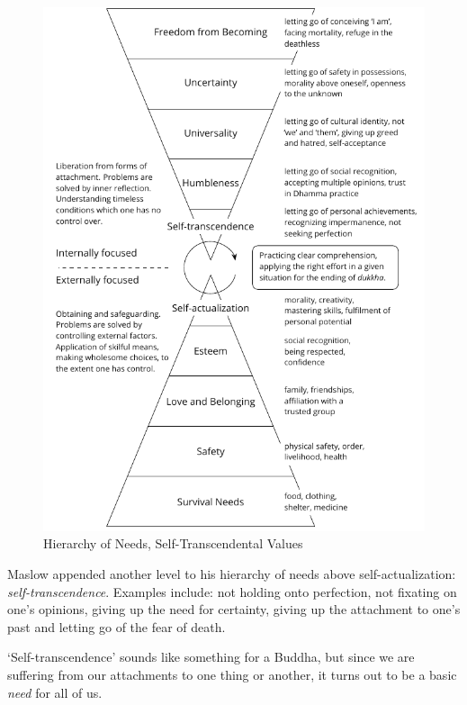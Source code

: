 \begin{figure}[h]
\vspace*{-15pt}
\caption{Hierarchy of Needs, Self-Transcendental Values}\label{fig-self-transcendental}
\bigskip
\includegraphics[width=\linewidth]{./manuscript/tex/diagrams/self-transcendental-values.pdf}
\end{figure}

\clearpage
\normalpagelayout

Maslow appended another level to his hierarchy of needs above
self-actualization: \emph{self-transcendence}. Examples include: not
holding onto perfection, not fixating on one's opinions, giving up the
need for certainty, giving up the attachment to one's past and letting
go of the fear of death.

`Self-transcendence' sounds like something for a Buddha, but since we
are suffering from our attachments to one thing or another, it turns out
to be a basic \emph{need} for all of us.

